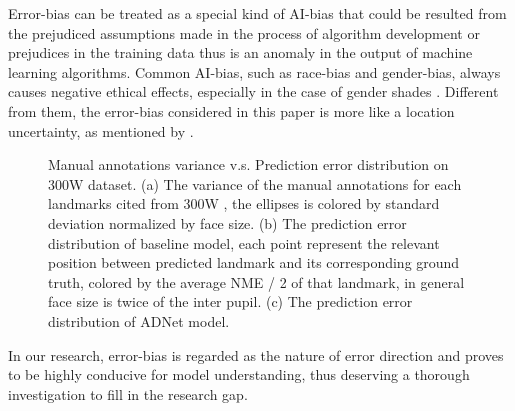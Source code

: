 \documentclass[10pt,twocolumn,letterpaper]{article}
\begin{document}
Error-bias can be treated as a special kind of AI-bias that could be resulted from the prejudiced assumptions made in the process of algorithm development or prejudices in the training data thus is an anomaly in the output of machine learning algorithms. Common AI-bias, such as race-bias and gender-bias, always causes negative ethical effects, especially in the case of gender shades \cite{buolamwini2018gender}. Different from them, the error-bias considered in this paper is more like a location uncertainty, as mentioned by \cite{kumar2020luvli}.

\begin{figure}[t]
\centering
{}
   \caption{Manual annotations variance v.s. Prediction error distribution on 300W dataset.
   (a) The variance of the manual annotations for each landmarks cited from 300W \cite{sagonas2016300}, the ellipses is colored by standard deviation normalized by face size. (b) The prediction error distribution of baseline model, each point represent the relevant position between predicted landmark and its corresponding ground truth, colored by the average NME / 2 of that landmark, in general face size is twice of the inter pupil. (c) The prediction error distribution of ADNet model.}
\label{figure:error_distribution}
\end{figure}

In our research, error-bias is regarded as the nature of error direction and proves to be highly conducive for model understanding, thus deserving a thorough investigation to fill in the research gap. 
\end{document}

